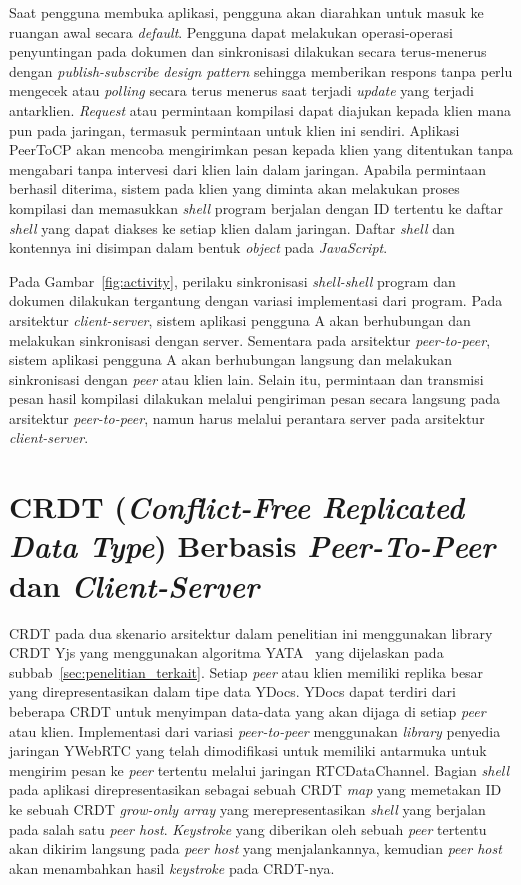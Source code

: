 Saat pengguna membuka aplikasi, pengguna akan diarahkan untuk masuk ke ruangan awal secara \textit{default}. Pengguna dapat melakukan operasi-operasi penyuntingan pada dokumen dan sinkronisasi dilakukan secara terus-menerus dengan \textit{publish-subscribe design pattern} sehingga memberikan respons tanpa perlu mengecek atau \textit{polling} secara terus menerus saat terjadi \textit{update} yang terjadi antarklien. \textit{Request} atau permintaan kompilasi dapat diajukan kepada klien mana pun pada jaringan, termasuk permintaan untuk klien ini sendiri. Aplikasi PeerToCP akan mencoba mengirimkan pesan kepada klien yang ditentukan tanpa mengabari tanpa intervesi dari klien lain dalam jaringan. Apabila permintaan berhasil diterima, sistem pada klien yang diminta akan melakukan proses kompilasi dan memasukkan \textit{shell} program berjalan dengan ID tertentu ke daftar \textit{shell} yang dapat diakses ke setiap klien dalam jaringan. Daftar \textit{shell} dan kontennya ini disimpan dalam bentuk \textit{object} pada \textit{JavaScript}.

Pada Gambar~\ref{fig:activity}, perilaku sinkronisasi \textit{shell-shell} program dan dokumen dilakukan tergantung dengan variasi implementasi dari program. Pada arsitektur \textit{client-server}, sistem aplikasi pengguna A akan berhubungan dan melakukan sinkronisasi dengan server. Sementara pada arsitektur \textit{peer-to-peer}, sistem aplikasi pengguna A akan berhubungan langsung dan melakukan sinkronisasi dengan \textit{peer} atau klien lain. Selain itu, permintaan dan transmisi pesan hasil kompilasi dilakukan melalui pengiriman pesan secara langsung pada arsitektur \textit{peer-to-peer}, namun harus melalui perantara server pada arsitektur \textit{client-server}.


\section{CRDT (\textit{Conflict-Free Replicated Data Type}) Berbasis \textit{Peer-To-Peer} dan \textit{Client-Server}}
\label{sec:desain_crdt}

CRDT pada dua skenario arsitektur dalam penelitian ini menggunakan library CRDT Yjs yang menggunakan algoritma YATA~\citep{Nicolaescu2016yjs} yang dijelaskan pada subbab~\ref{sec:penelitian_terkait}. Setiap \textit{peer} atau klien memiliki replika besar yang direpresentasikan dalam tipe data YDocs. YDocs dapat terdiri dari beberapa CRDT untuk menyimpan data-data yang akan dijaga di setiap \textit{peer} atau klien. Implementasi dari variasi \textit{peer-to-peer} menggunakan \textit{library} penyedia jaringan YWebRTC yang telah dimodifikasi untuk memiliki antarmuka untuk mengirim pesan ke \textit{peer} tertentu melalui jaringan RTCDataChannel. Bagian \textit{shell} pada aplikasi direpresentasikan sebagai sebuah CRDT \textit{map} yang memetakan ID ke sebuah CRDT \textit{grow-only array} yang merepresentasikan \textit{shell} yang berjalan pada salah satu \textit{peer host}. \textit{Keystroke} yang diberikan oleh sebuah \textit{peer} tertentu akan dikirim langsung pada \textit{peer host} yang menjalankannya, kemudian \textit{peer host} akan menambahkan hasil \textit{keystroke} pada CRDT-nya.


